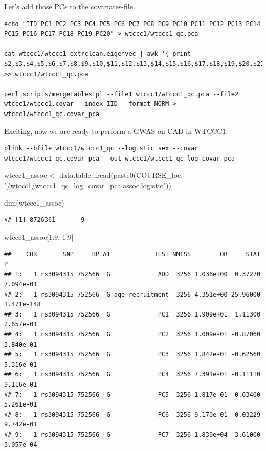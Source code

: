 \documentclass[
]{book}
\newenvironment{Shaded}{\begin{snugshade}}{\end{snugshade}}
\newcommand{\DecValTok}[1]{\textcolor[rgb]{0.00,0.00,0.81}{#1}}
\newcommand{\FunctionTok}[1]{\textcolor[rgb]{0.00,0.00,0.00}{#1}}
\newcommand{\NormalTok}[1]{#1}
\newcommand{\OtherTok}[1]{\textcolor[rgb]{0.56,0.35,0.01}{#1}}
\newcommand{\SpecialCharTok}[1]{\textcolor[rgb]{0.00,0.00,0.00}{#1}}
\newcommand{\StringTok}[1]{\textcolor[rgb]{0.31,0.60,0.02}{#1}}
\begin{document}
Let's add those PCs to the covariates-file.

\begin{verbatim}
echo "IID PC1 PC2 PC3 PC4 PC5 PC6 PC7 PC8 PC9 PC10 PC11 PC12 PC13 PC14 PC15 PC16 PC17 PC18 PC19 PC20" > wtccc1/wtccc1_qc.pca

cat wtccc1/wtccc1_extrclean.eigenvec | awk '{ print $2,$3,$4,$5,$6,$7,$8,$9,$10,$11,$12,$13,$14,$15,$16,$17,$18,$19,$20,$21,$22}' >> wtccc1/wtccc1_qc.pca

perl scripts/mergeTables.pl --file1 wtccc1/wtccc1_qc.pca --file2 wtccc1/wtccc1.covar --index IID --format NORM > wtccc1/wtccc1_qc.covar_pca
\end{verbatim}

Exciting, now we are ready to perform a GWAS on CAD in WTCCC1.

\begin{verbatim}
plink --bfile wtccc1/wtccc1_qc --logistic sex --covar wtccc1/wtccc1_qc.covar_pca --out wtccc1/wtccc1_qc_log_covar_pca
\end{verbatim}

\begin{Shaded}
\begin{Highlighting}[]
\NormalTok{wtccc1\_assoc }\OtherTok{\textless{}{-}}\NormalTok{ data.table}\SpecialCharTok{::}\FunctionTok{fread}\NormalTok{(}\FunctionTok{paste0}\NormalTok{(COURSE\_loc, }\StringTok{"/wtccc1/wtccc1\_qc\_log\_covar\_pca.assoc.logistic"}\NormalTok{))}

\FunctionTok{dim}\NormalTok{(wtccc1\_assoc)}
\end{Highlighting}
\end{Shaded}

\begin{verbatim}
## [1] 8726361       9
\end{verbatim}

\begin{Shaded}
\begin{Highlighting}[]
\NormalTok{wtccc1\_assoc[}\DecValTok{1}\SpecialCharTok{:}\DecValTok{9}\NormalTok{, }\DecValTok{1}\SpecialCharTok{:}\DecValTok{9}\NormalTok{]}
\end{Highlighting}
\end{Shaded}

\begin{verbatim}
##    CHR       SNP     BP A1            TEST NMISS        OR     STAT          P
## 1:   1 rs3094315 752566  G             ADD  3256 1.036e+00  0.37270  7.094e-01
## 2:   1 rs3094315 752566  G age_recruitment  3256 4.351e+00 25.96000 1.471e-148
## 3:   1 rs3094315 752566  G             PC1  3256 1.909e+01  1.11300  2.657e-01
## 4:   1 rs3094315 752566  G             PC2  3256 1.009e-01 -0.87060  3.840e-01
## 5:   1 rs3094315 752566  G             PC3  3256 1.842e-01 -0.62560  5.316e-01
## 6:   1 rs3094315 752566  G             PC4  3256 7.391e-01 -0.11110  9.116e-01
## 7:   1 rs3094315 752566  G             PC5  3256 1.817e-01 -0.63400  5.261e-01
## 8:   1 rs3094315 752566  G             PC6  3256 9.170e-01 -0.03229  9.742e-01
## 9:   1 rs3094315 752566  G             PC7  3256 1.839e+04  3.61000  3.057e-04
\end{verbatim}
\end{document}
